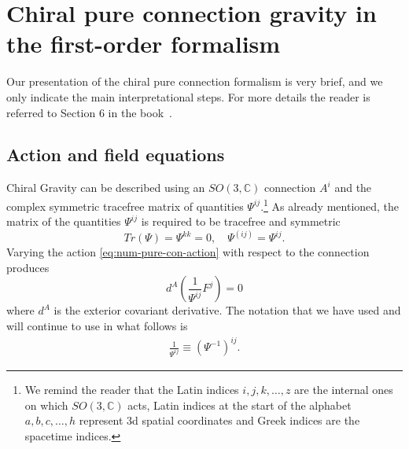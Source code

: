 \documentclass[10pt]{report}
\theoremstyle{definition}
\begin{document}
\section{Chiral pure connection gravity in the first-order formalism} \label{sec:pure-connection-chiral-first-order}

Our presentation of the chiral pure connection formalism is very brief, and we only indicate the main interpretational steps. For more details the reader is referred to Section 6 in the book~\cite{FormGenRelGravity2020}.

\subsection{Action and field equations}


Chiral Gravity can be described using an $SO(3,\mathbb{C})$ connection $A^i$ and the complex symmetric tracefree matrix of quantities $\Psi^{ij}$.\footnote{ We remind the reader that the Latin indices $i,j,k,\ldots,z$ are the internal ones on which $SO(3,\mathbb{C})$ acts, Latin indices at the start of the alphabet $a,b,c,\ldots,h$ represent 3d spatial coordinates and Greek indices are the spacetime indices.} As already mentioned, the matrix of the quantities $\Psi^{ij}$ is required to be  tracefree  and symmetric 
\begin{equation}
    Tr(\Psi) = \Psi^{kk} = 0, \quad \Psi^{(ij)} = \Psi^{ij}.
\end{equation}
Varying the action \cref{eq:num-pure-con-action} with respect to the connection produces
\begin{equation}
   d^A \left( \frac{1}{\Psi^{ij}} F^j \right) = 0 
    \label{eq:CPC_Lagrangian_variation_wrt_A}
\end{equation}
where $d^A$ is the exterior covariant derivative. The notation that we have used and will continue to use in what follows is 
\begin{align}
\frac{1}{\Psi^{ij}} \equiv (\Psi^{-1})^{ij}.
\end{align}
\end{document}
